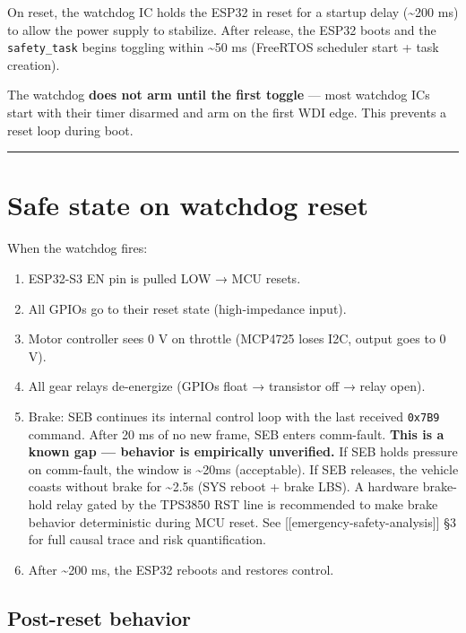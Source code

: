 \documentclass[12pt,a4paper,oneside]{report}
\providecommand{\tightlist}{\setlength{\itemsep}{0pt}\setlength{\parskip}{0pt}}
\begin{document}
On reset, the watchdog IC holds the ESP32 in reset for a startup delay
(\textasciitilde200 ms) to allow the power supply to stabilize. After release,
the ESP32 boots and the \texttt{safety\_task} begins toggling within
\textasciitilde50 ms (FreeRTOS scheduler start + task creation).

The watchdog \textbf{does not arm until the first toggle} --- most watchdog ICs
start with their timer disarmed and arm on the first WDI edge. This prevents a
reset loop during boot.

\begin{center}\rule{0.5\linewidth}{0.5pt}\end{center}

\section{Safe state on watchdog reset}\label{safe-state-on-watchdog-reset}

When the watchdog fires:

\begin{enumerate}
\def\labelenumi{\arabic{enumi}.}
\tightlist
\item
  ESP32-S3 EN pin is pulled LOW → MCU resets.
\item
  All GPIOs go to their reset state (high-impedance input).
\item
  Motor controller sees 0 V on throttle (MCP4725 loses I2C, output goes to 0 V).
\item
  All gear relays de-energize (GPIOs float → transistor off → relay open).
\item
  Brake: SEB continues its internal control loop with the last received
  \texttt{0x7B9} command. After 20 ms of no new frame, SEB enters comm-fault.
  \textbf{This is a known gap --- behavior is empirically unverified.} If SEB
  holds pressure on comm-fault, the window is \textasciitilde20ms (acceptable).
  If SEB releases, the vehicle coasts without brake for \textasciitilde2.5s (SYS
  reboot + brake LBS). A hardware brake-hold relay gated by the TPS3850 RST line
  is recommended to make brake behavior deterministic during MCU reset. See
  {[}{[}emergency-safety-analysis{]}{]} §3 for full causal trace and risk
  quantification.
\item
  After \textasciitilde200 ms, the ESP32 reboots and restores control.
\end{enumerate}

\subsection{Post-reset behavior}\label{post-reset-behavior}
\end{document}
